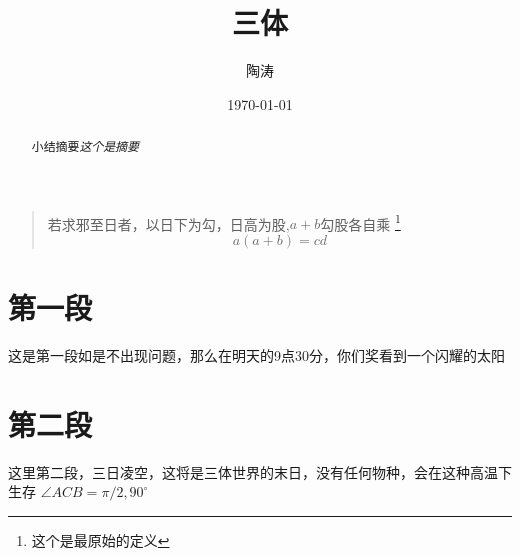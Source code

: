 \documentclass[UTF8]{ctexart}
\title{三体}
\author{陶涛}
\date{\today}
\begin{document}
\maketitle

\tableofcontents

\begin{abstract}
小结摘要\emph{这个是摘要}
\end{abstract}

\begin{quote}
\kaishu 若求邪至日者，以日下为勾，日高为股,$a+b$勾股各自乘 \footnote{这个是最原始的定义}
\begin{equation}
a(a+b)=cd
\end{equation}
\end{quote}

\section{第一段}
这是第一段如是不出现问题，那么在明天的9点30分，你们奖看到一个闪耀的太阳
\section{第二段}
这里第二段，三日凌空，这将是三体世界的末日，没有任何物种，会在这种高温下生存
$\angle ACB=\pi /2,90^\circ$

\end{document}
